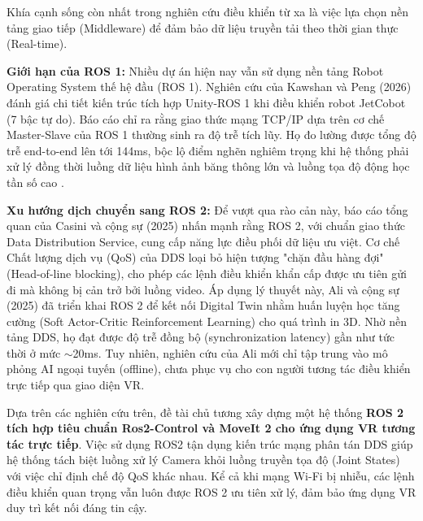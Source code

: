 Khía cạnh sống còn nhất trong nghiên cứu điều khiển từ xa là việc lựa chọn nền tảng giao tiếp (Middleware) để đảm bảo dữ liệu truyền tải theo thời gian thực (Real-time).

\textbf{Giới hạn của ROS 1:} Nhiều dự án hiện nay vẫn sử dụng nền tảng Robot Operating System thế hệ đầu (ROS 1). Nghiên cứu của Kawshan và Peng (2026) \cite{kawshan2026digital} đánh giá chi tiết kiến trúc tích hợp Unity-ROS 1 khi điều khiển robot JetCobot (7 bậc tự do). Báo cáo chỉ ra rằng giao thức mạng TCP/IP dựa trên cơ chế Master-Slave của ROS 1 thường sinh ra độ trễ tích lũy. Họ đo lường được tổng độ trễ end-to-end lên tới 144ms, bộc lộ điểm nghẽn nghiêm trọng khi hệ thống phải xử lý đồng thời luồng dữ liệu hình ảnh băng thông lớn và luồng tọa độ động học tần số cao \cite{kawshan2026digital}. 

\textbf{Xu hướng dịch chuyển sang ROS 2:} Để vượt qua rào cản này, báo cáo tổng quan của Casini và cộng sự (2025) \cite{casini2025survey} nhấn mạnh rằng ROS 2, với chuẩn giao thức Data Distribution Service, cung cấp năng lực điều phối dữ liệu ưu việt. Cơ chế Chất lượng dịch vụ (QoS) của DDS loại bỏ hiện tượng "chặn đầu hàng đợi" (Head-of-line blocking), cho phép các lệnh điều khiển khẩn cấp được ưu tiên gửi đi mà không bị cản trở bởi luồng video. Áp dụng lý thuyết này, Ali và cộng sự (2025) \cite{ali2025digital} đã triển khai ROS 2 để kết nối Digital Twin nhằm huấn luyện học tăng cường (Soft Actor-Critic Reinforcement Learning) cho quá trình in 3D. Nhờ nền tảng DDS, họ đạt được độ trễ đồng bộ (synchronization latency) gần như tức thời ở mức $\sim$20ms. Tuy nhiên, nghiên cứu của Ali \cite{ali2025digital} mới chỉ tập trung vào mô phỏng AI ngoại tuyến (offline), chưa phục vụ cho con người tương tác điều khiển trực tiếp qua giao diện VR.

Dựa trên các nghiên cứu trên, đề tài chủ tương xây dựng một hệ thống \textbf{ROS 2 tích hợp tiêu chuẩn Ros2-Control và MoveIt 2 cho ứng dụng VR tương tác trực tiếp}. Việc sử dụng ROS2 tận dụng kiến trúc mạng phân tán DDS giúp hệ thống tách biệt luồng xử lý Camera khỏi luồng truyền tọa độ (Joint States) với việc chỉ định chế độ QoS khác nhau. Kể cả khi mạng Wi-Fi bị nhiễu, các lệnh điều khiển quan trọng vẫn luôn được ROS 2 ưu tiên xử lý, đảm bảo ứng dụng VR duy trì kết nối đáng tin cậy.